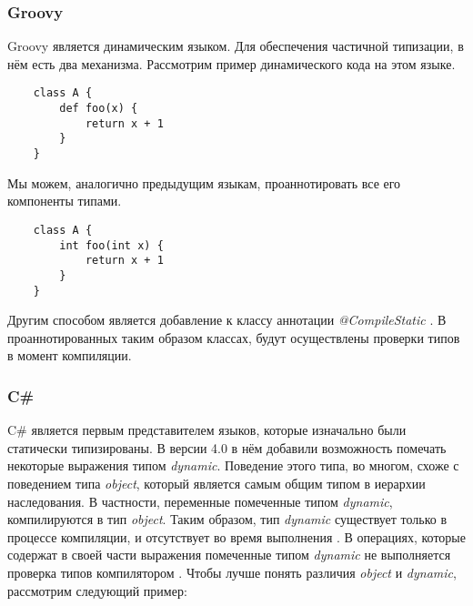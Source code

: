 \subsubsection{Groovy}

Groovy является динамическим языком. Для обеспечения частичной типизации, в нём есть два механизма. Рассмотрим пример динамического кода на этом языке.

\begin{verbatim}
    class A {
        def foo(x) {
            return x + 1
        }
    }
\end{verbatim}

Мы можем, аналогично предыдущим языкам, проаннотировать все его компоненты типами.

\begin{verbatim}
    class A {
        int foo(int x) {
            return x + 1
        }
    }
\end{verbatim}

Другим способом является добавление к классу аннотации \textit{@CompileStatic} \cite{groovy:compileStatic}. В проаннотированных таким образом классах, будут осуществлены проверки типов в момент компиляции.



\subsubsection{C{\#}}

    C{\#} является первым представителем языков, которые изначально были статически типизированы. В версии 4.0 в нём добавили возможность помечать некоторые выражения типом \textit{dynamic}. Поведение этого типа, во многом, схоже с поведением типа \textit{object}, который является самым общим типом в иерархии наследования. В частности, переменные помеченные типом \textit{dynamic}, компилируются в тип \textit{object}. Таким образом, тип \textit{dynamic} существует только в процессе компиляции, и отсутствует во время выполнения \cite{msdn:dynamicType}. В операциях, которые содержат в своей части выражения помеченные типом \textit{dynamic} не выполняется проверка типов компилятором \cite{book:troelsen2012proCSharp}. Чтобы лучше понять различия \textit{object} и \textit{dynamic}, рассмотрим следующий пример:

